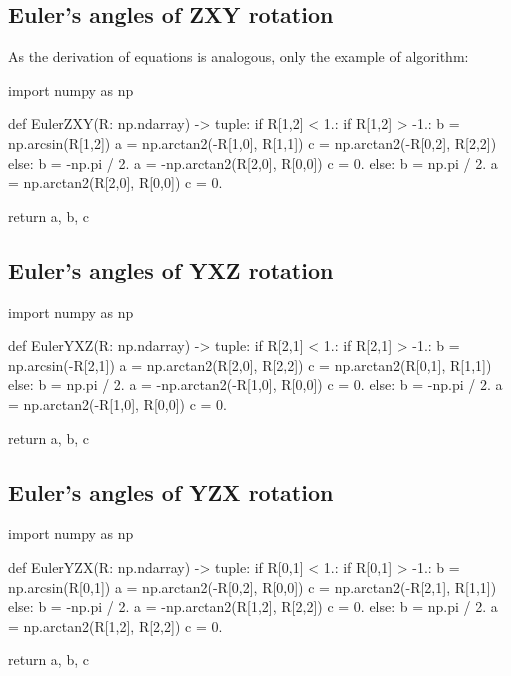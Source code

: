 \subsection{Euler's angles of \textbf{ZXY} rotation}

        As the derivation of equations is analogous, only the example of algorithm:
\begin{python}
import numpy as np

def EulerZXY(R: np.ndarray) -> tuple:
    if R[1,2] < 1.:
        if R[1,2] > -1.:
            b = np.arcsin(R[1,2])
            a = np.arctan2(-R[1,0], R[1,1])
            c = np.arctan2(-R[0,2], R[2,2])
        else:
            b = -np.pi / 2.
            a = -np.arctan2(R[2,0], R[0,0])
            c = 0.
    else:
        b = np.pi / 2.
        a = np.arctan2(R[2,0], R[0,0])
        c = 0.

    return a, b, c
\end{python}

\subsection{Euler's angles of \textbf{YXZ} rotation}

\begin{python}
import numpy as np

def EulerYXZ(R: np.ndarray) -> tuple:
    if R[2,1] < 1.:
        if R[2,1] > -1.:
            b = np.arcsin(-R[2,1])
            a = np.arctan2(R[2,0], R[2,2])
            c = np.arctan2(R[0,1], R[1,1])
        else:
            b = np.pi / 2.
            a = -np.arctan2(-R[1,0], R[0,0])
            c = 0.
    else:
        b = -np.pi / 2.
        a = np.arctan2(-R[1,0], R[0,0])
        c = 0.

    return a, b, c
\end{python}

\subsection{Euler's angles of \textbf{YZX} rotation}

\begin{python}
import numpy as np

def EulerYZX(R: np.ndarray) -> tuple:
    if R[0,1] < 1.:
        if R[0,1] > -1.:
            b = np.arcsin(R[0,1])
            a = np.arctan2(-R[0,2], R[0,0])
            c = np.arctan2(-R[2,1], R[1,1])
        else:
            b = -np.pi / 2.
            a = -np.arctan2(R[1,2], R[2,2])
            c = 0.
    else:
        b = np.pi / 2.
        a = np.arctan2(R[1,2], R[2,2])
        c = 0.

    return a, b, c
\end{python}

